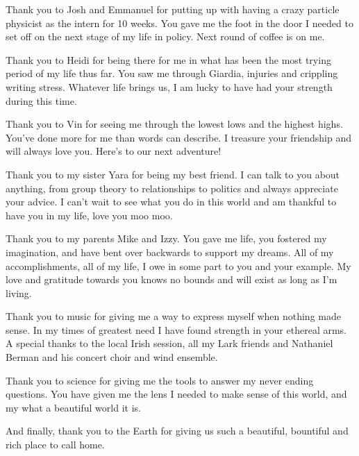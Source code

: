 Thank you to Josh and Emmanuel for putting up with having a crazy particle
physicist as the intern for 10 weeks.  You gave me the foot in the door I
needed to set off on the next stage of my life in policy.  Next round of coffee
is on me.

Thank you to Heidi for being there for me in what has been the most trying
period of my life thus far.  You saw me through Giardia, injuries and crippling
writing stress.  Whatever life brings us, I am lucky to have had your strength
during this time. 

Thank you to Vin for seeing me through the lowest lows and the highest highs.
You've done more for me than words can describe.  I treasure your friendship
and will always love you.  Here's to our next adventure!

Thank you to my sister Yara for being my best friend.  I can talk to you about
anything, from group theory to relationships to politics and always appreciate
your advice.  I can't wait to see what you do in this world and am thankful to
have you in my life, love you moo moo.

Thank you to my parents Mike and Izzy.  You gave me life, you fostered my
imagination, and have bent over backwards to support my dreams.  All of my
accomplishments, all of my life, I owe in some part to you and your example. My
love and gratitude towards you knows no bounds and will exist as long as I'm
living.

Thank you to music for giving me a way to express myself when nothing made
sense.  In my times of greatest need I have found strength in your ethereal
arms. A special thanks to the local Irish session, all my Lark friends and
Nathaniel Berman and his concert choir and wind ensemble.

Thank you to science for giving me the tools to answer my never ending
questions.  You have given me the lens I needed to make sense of this world,
and my what a beautiful world it is. 

And finally, thank you to the Earth for giving us such a beautiful, bountiful
and rich place to call home.
